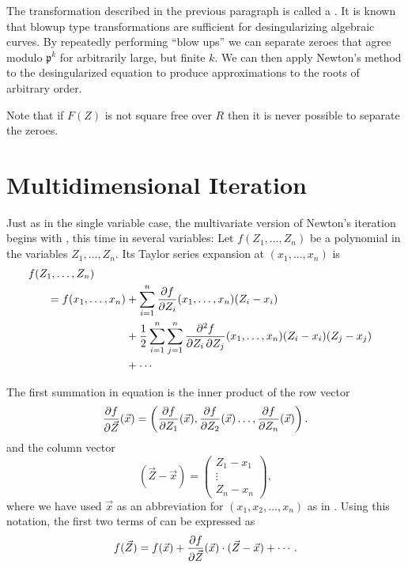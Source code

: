 The transformation described in the previous paragraph is called a
.  It is known that blowup type transformations are
sufficient for desingularizing algebraic 
curves.  By repeatedly 
performing ``blow ups'' we can separate zeroes that agree modulo
$\mathfrak{p}^k$ for arbitrarily large, but finite $k$.  We can then
apply Newton's method to the desingularized equation to produce
approximations to the roots of arbitrary order.  

Note that if $F(Z)$ is not square free over $R$ then it is never
possible to separate the zeroes.

\section{Multidimensional Iteration}
\label{Multivariate:Newton:Sec}

Just as in the single variable case, the multivariate version of
Newton's iteration begins with , this time in several
variables: Let $f(Z_1, \ldots, Z_n)$ be a polynomial in the variables
$Z_1, \ldots, Z_n$.  Its Taylor series expansion at $(x_1,\ldots,
x_n)$ is
\begin{equation}\label{Hensel:8}
\begin{aligned}
  \multispan{1}{$f(Z_1,\ldots, Z_n)$}\\
    \qquad = f(x_1,\ldots, x_n) &\null + 
    \sum_{i=1}^n {\partial f \over \partial Z_i}(x_1,\ldots,x_n) 
    (Z_i - x_i)\\
   & + {1 \over 2} \sum_{i=1}^n \sum_{j=1}^n
    {\partial^2 f \over \partial Z_i \, \partial Z_j}(x_1,\ldots,x_n) 
    (Z_i - x_i) (Z_j - x_j)\\
   & + \cdots\\
\end{aligned}
\end{equation}

The first summation in equation  is the inner product
of the row vector
\[
{\partial f \over \partial \vec{Z}} (\vec{x}) =
\left({\partial f \over \partial Z_1} (\vec{x}), 
{\partial f \over \partial Z_2} (\vec{x})
\ldots, {\partial f \over \partial Z_n} (\vec{x}) \right).
\]
and the column vector
\[
(\vec{Z} - \vec{x}) = \begin{pmatrix}Z_1 - x_1\\ \vdots\\ Z_n - x_n\end{pmatrix},
\]
where we have used $\vec{x}$ as an abbreviation for $(x_1, x_2, \ldots,
x_n)$ as in .  Using this notation, the
first two terms of  can be expressed as
\[
f(\vec{Z} ) = f(\vec{x}) + {\partial f \over \partial \vec{Z}}
(\vec{x}) \cdot (\vec{Z}  - \vec{x}) + \cdots.
\]

